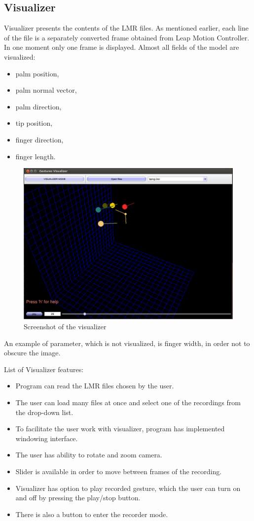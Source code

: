 \subsection{Visualizer}
Visualizer presents the contents of the LMR files. As mentioned earlier, each line of the file is a separately converted frame obtained from Leap Motion Controller. In one moment only one frame is displayed.
Almost all fields of the model are visualized:
\begin{itemize}
\item palm position,
\item palm normal vector,
\item palm direction,
\item tip position,
\item finger direction,
\item finger length.
\end{itemize}

\begin{figure}[htb]
\centering
 \includegraphics[width=1\columnwidth]{figures/visualizer.png}
 \caption{Screenshot of the visualizer}
 \label{visualizer}
\end{figure}

An example of parameter, which is not visualized, is finger width, in order not to obscure the image.

List of Visualizer features:
\begin{itemize}
\item Program can read the LMR files chosen by the user.
\item The user can load many files at once and select one of the recordings from the drop-down list.
\item To facilitate the user work with visualizer, program has implemented windowing interface.
\item The user has ability to rotate and zoom camera.
\item Slider is available in order to move between frames of the recording.
\item Visualizer has option to play recorded gesture, which the user can turn on and off by pressing the play/stop button.
\item There is also a button to enter the recorder mode.
\end{itemize}

